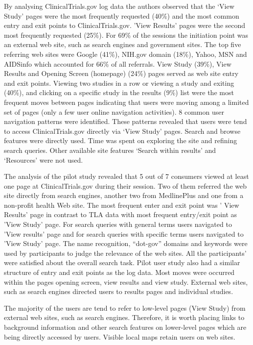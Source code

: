 \documentclass[]{article}
\begin{document}
By analysing ClinicalTrials.gov log data the authors observed that the ‘View Study' pages were the most frequently requested (40\%) and the most common entry and exit points to ClinicalTrials.gov. 'View Results' pages were the second most frequently requested (25\%). For 69\% of the sessions the initiation point was an external web site, such as search engines and government sites. The top five referring web sites were Google (41\%), NIH.gov domain (18\%), Yahoo, MSN and AIDSinfo which accounted for 66\% of all referrals. View Study (39\%), View Results and Opening Screen (homepage)  (24\%) pages served as web site entry and exit points. Viewing two studies in a row or viewing a study and exiting (40\%), and clicking on a specific study in the results (9\%) list were the most frequent moves between pages indicating that users were moving among a limited set of pages (only a few user online navigation activities). 8 common user navigation patterns were identified. These patterns revealed that users were tend to access ClinicalTrials.gov directly via ‘View Study’ pages. Search and browse features were directly used. Time was spent on exploring the site and refining search queries. Other available site features ‘Search within results’ and ‘Resources’ were not used.

The analysis of the pilot study revealed that 5 out of 7 consumers viewed at least one page at ClinicalTrials.gov during their session. Two of them referred the web site directly from search engines, another two from MedlinePlus and one from a non-profit health Web site. The most frequent enter and exit point was ' View Results' page in contrast to TLA data with most frequent entry/exit point as 'View Study' page. For search queries with general terms users navigated to 'View results' page and for search queries with specific terms users navigated to 'View Study' page. The name recognition, “dot-gov” domains and keywords were used by participants to judge the relevance of the web sites. All the participants' were satisfied about the overall search task. Pilot user study also had a similar structure of entry and exit points as the log data. Most moves were occurred within the pages opening screen, view results and view study. External web sites, such as search engines directed users to results pages and individual studies. 

The majority of the users are tend to refer to low-level pages (View Study) from external web sites, such as search engines. Therefore, it is worth placing links to background information and other search features on lower-level pages which are being directly accessed by users. Visible local maps retain users on web sites.
\end{document}

